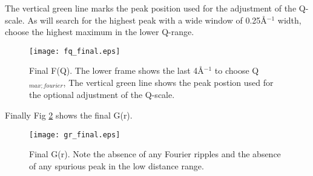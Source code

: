 The vertical green line marks the peak position used for the adjustment of the
Q-scale. As \Discus will search for the highest peak with a wide window of 
0.25\AA$^{-1}$ width, choose the highest maximum in the lower Q-range. 
%
\begin{figure}[!b]
   \centering
   \texttt{[image: fq\_final.eps]}
   \vspace*{+5mm} 
   \caption{Final F(Q). The lower frame shows the last 4\AA$^{-1}$ to
            choose Q$_{max;fourier}$, The vertical green line shows
            the peak postion used for the optional adjustment of the Q-scale.}
   \label{data-pdf-fig2}
\end{figure}
%

Finally Fig \ref{data-pdf-fig3} shows the final G(r). 

%
\begin{figure}[!b]
   \centering
   \texttt{[image: gr\_final.eps]}
   \vspace*{+5mm} 
   \caption{Final G(r). Note the absence of any Fourier ripples and the
            absence of any spurious peak in the low distance range.}
   \label{data-pdf-fig3}
\end{figure}
%


